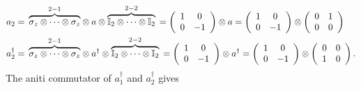 \documentclass[aps,preprint]{revtex4}%
\begin{document}
\begin{align}
a_{2}  &  =\,\overset{2-1}{\overbrace{\mathbb{\sigma}_{z}\otimes\cdots
\otimes\mathbb{\sigma}_{z}}}\otimes a\otimes
\overset{2-2}{\overbrace{\mathbb{I}_{2}\otimes\cdots\otimes\mathbb{I}_{2}}%
}\,=\left(
\begin{array}
[c]{cc}%
1 & 0\\
0 & -1
\end{array}
\right)  \otimes a=\left(
\begin{array}
[c]{cc}%
1 & 0\\
0 & -1
\end{array}
\right)  \otimes\left(
\begin{array}
[c]{cc}%
0 & 1\\
0 & 0
\end{array}
\right) \\
a_{2}^{\dagger}  &  =\,\overset{2-1}{\overbrace{\mathbb{\sigma}_{z}%
\otimes\cdots\otimes\mathbb{\sigma}_{z}}}\otimes a^{\dagger}\otimes
\overset{2-2}{\overbrace{\mathbb{I}_{2}\otimes\cdots\otimes\mathbb{I}_{2}}%
}\,=\left(
\begin{array}
[c]{cc}%
1 & 0\\
0 & -1
\end{array}
\right)  \otimes a^{\dagger}=\left(
\begin{array}
[c]{cc}%
1 & 0\\
0 & -1
\end{array}
\right)  \otimes\left(
\begin{array}
[c]{cc}%
0 & 0\\
1 & 0
\end{array}
\right)  .
\end{align}
The aniti commutator of $a_{1}^{\dagger}$ and $a_{2}^{\dagger}$ gives
\end{document}
